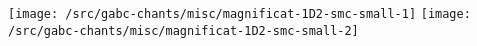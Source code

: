 \texttt{[image: /src/gabc-chants/misc/magnificat-1D2-smc-small-1]}%
\ifx\betweenLilyPondSystem \undefined
  \linebreak
\else
  \expandafter{}%
\fi
\texttt{[image: /src/gabc-chants/misc/magnificat-1D2-smc-small-2]}%
\vspace{1.225in}
